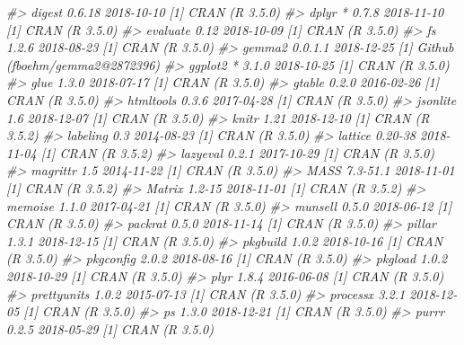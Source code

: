 \documentclass[oneside]{book}
\newenvironment{Shaded}{\begin{snugshade}}{\end{snugshade}}
\newcommand{\CommentTok}[1]{\textcolor[rgb]{0.56,0.35,0.01}{\textit{#1}}}
\begin{document}
\begin{Shaded}
\begin{Highlighting}[]
\CommentTok{#>  digest        0.6.18     2018-10-10 [1] CRAN (R 3.5.0)                   }
\CommentTok{#>  dplyr       * 0.7.8      2018-11-10 [1] CRAN (R 3.5.0)                   }
\CommentTok{#>  evaluate      0.12       2018-10-09 [1] CRAN (R 3.5.0)                   }
\CommentTok{#>  fs            1.2.6      2018-08-23 [1] CRAN (R 3.5.0)                   }
\CommentTok{#>  gemma2        0.0.1.1    2018-12-25 [1] Github (fboehm/gemma2@2872396)   }
\CommentTok{#>  ggplot2     * 3.1.0      2018-10-25 [1] CRAN (R 3.5.0)                   }
\CommentTok{#>  glue          1.3.0      2018-07-17 [1] CRAN (R 3.5.0)                   }
\CommentTok{#>  gtable        0.2.0      2016-02-26 [1] CRAN (R 3.5.0)                   }
\CommentTok{#>  htmltools     0.3.6      2017-04-28 [1] CRAN (R 3.5.0)                   }
\CommentTok{#>  jsonlite      1.6        2018-12-07 [1] CRAN (R 3.5.0)                   }
\CommentTok{#>  knitr         1.21       2018-12-10 [1] CRAN (R 3.5.2)                   }
\CommentTok{#>  labeling      0.3        2014-08-23 [1] CRAN (R 3.5.0)                   }
\CommentTok{#>  lattice       0.20-38    2018-11-04 [1] CRAN (R 3.5.2)                   }
\CommentTok{#>  lazyeval      0.2.1      2017-10-29 [1] CRAN (R 3.5.0)                   }
\CommentTok{#>  magrittr      1.5        2014-11-22 [1] CRAN (R 3.5.0)                   }
\CommentTok{#>  MASS          7.3-51.1   2018-11-01 [1] CRAN (R 3.5.2)                   }
\CommentTok{#>  Matrix        1.2-15     2018-11-01 [1] CRAN (R 3.5.2)                   }
\CommentTok{#>  memoise       1.1.0      2017-04-21 [1] CRAN (R 3.5.0)                   }
\CommentTok{#>  munsell       0.5.0      2018-06-12 [1] CRAN (R 3.5.0)                   }
\CommentTok{#>  packrat       0.5.0      2018-11-14 [1] CRAN (R 3.5.0)                   }
\CommentTok{#>  pillar        1.3.1      2018-12-15 [1] CRAN (R 3.5.0)                   }
\CommentTok{#>  pkgbuild      1.0.2      2018-10-16 [1] CRAN (R 3.5.0)                   }
\CommentTok{#>  pkgconfig     2.0.2      2018-08-16 [1] CRAN (R 3.5.0)                   }
\CommentTok{#>  pkgload       1.0.2      2018-10-29 [1] CRAN (R 3.5.0)                   }
\CommentTok{#>  plyr          1.8.4      2016-06-08 [1] CRAN (R 3.5.0)                   }
\CommentTok{#>  prettyunits   1.0.2      2015-07-13 [1] CRAN (R 3.5.0)                   }
\CommentTok{#>  processx      3.2.1      2018-12-05 [1] CRAN (R 3.5.0)                   }
\CommentTok{#>  ps            1.3.0      2018-12-21 [1] CRAN (R 3.5.0)                   }
\CommentTok{#>  purrr         0.2.5      2018-05-29 [1] CRAN (R 3.5.0)                   }

\end{Highlighting}
\end{Shaded}
\end{document}
